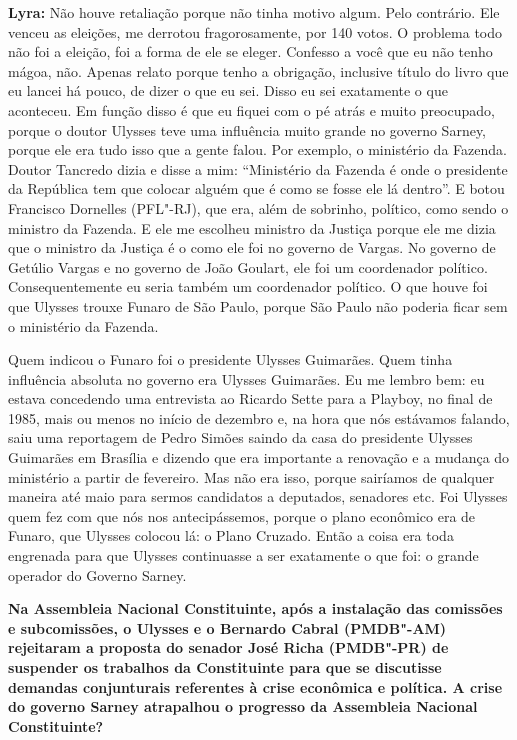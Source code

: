 \textbf{Lyra:} Não houve retaliação porque não tinha motivo algum. Pelo
contrário. Ele venceu as eleições, me derrotou fragorosamente, por 140
votos. O problema todo não foi a eleição, foi a forma de ele se eleger.
Confesso a você que eu não tenho mágoa, não. Apenas relato porque tenho
a obrigação, inclusive título do livro que eu lancei há pouco, de dizer
o que eu sei. Disso eu sei exatamente o que aconteceu. Em função disso é
que eu fiquei com o pé atrás e muito preocupado, porque o doutor Ulysses
teve uma influência muito grande no governo Sarney, porque ele era tudo
isso que a gente falou. Por exemplo, o ministério da Fazenda. Doutor
Tancredo dizia e disse a mim: ``Ministério da Fazenda é onde o
presidente da República tem que colocar alguém que é como se fosse ele
lá dentro''. E botou Francisco Dornelles (PFL"-RJ), que era, além de
sobrinho, político, como sendo o ministro da Fazenda. E ele me escolheu
ministro da Justiça porque ele me dizia que o ministro da Justiça é o
como ele foi no governo de Vargas. No governo de Getúlio Vargas e no
governo de João Goulart, ele foi um coordenador político.
Consequentemente eu seria também um coordenador político. O que houve
foi que Ulysses trouxe Funaro de São Paulo, porque São Paulo não poderia
ficar sem o ministério da Fazenda.

Quem indicou o Funaro foi o presidente Ulysses Guimarães. Quem tinha
influência absoluta no governo era Ulysses Guimarães. Eu me lembro bem:
eu estava concedendo uma entrevista ao Ricardo Sette para a Playboy, no
final de 1985, mais ou menos no início de dezembro e, na hora que nós
estávamos falando, saiu uma reportagem de Pedro Simões saindo da casa do
presidente Ulysses Guimarães em Brasília e dizendo que era importante a
renovação e a mudança do ministério a partir de fevereiro. Mas não era
isso, porque sairíamos de qualquer maneira até maio para sermos
candidatos a deputados, senadores etc. Foi Ulysses quem fez com que nós
nos antecipássemos, porque o plano econômico era de Funaro, que Ulysses
colocou lá: o Plano Cruzado. Então a coisa era toda engrenada para que
Ulysses continuasse a ser exatamente o que foi: o grande operador do
Governo Sarney.

\textbf{Na Assembleia Nacional Constituinte, após a instalação das
comissões e subcomissões, o Ulysses e o Bernardo Cabral (PMDB"-AM)
rejeitaram a proposta do senador José Richa (PMDB"-PR) de suspender os
trabalhos da Constituinte para que se discutisse demandas conjunturais
referentes à crise econômica e política. A crise do governo Sarney
atrapalhou o progresso da Assembleia Nacional Constituinte?}


